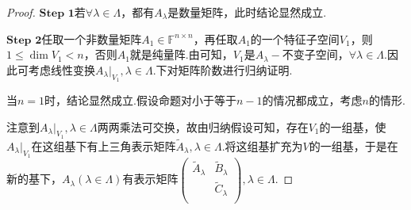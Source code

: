 \documentclass[../../main.tex]{subfiles}
\begin{document}
\begin{proof}
$\mathbf{Step}\,\,\mathbf{1}$若$\forall \lambda \in \Lambda$，都有$A_{\lambda}$是数量矩阵，此时结论显然成立.

$\mathbf{Step}\,\,\mathbf{2}$任取一个非数量矩阵$A_1\in \mathbb{F} ^{n\times n}$，再任取$A_1$的一个特征子空间$V_1$，则$1\leqslant \dim V_1<n$，否则$A_1$就是纯量阵.由可知，$V_1$是$A_{\lambda}-$不变子空间，$\forall \lambda \in \Lambda$.因此可考虑线性变换$A_{\lambda}|_{V_1},\lambda \in \Lambda$.下对矩阵阶数进行归纳证明.

当$n=1$时，结论显然成立.假设命题对小于等于$n - 1$的情况都成立，考虑$n$的情形.

注意到$A_{\lambda}|_{V_1},\lambda \in \Lambda$两两乘法可交换，故由归纳假设可知，存在$V_1$的一组基，使$A_{\lambda}|_{V_1}$在这组基下有上三角表示矩阵$\widetilde{A}_{\lambda},\lambda \in \Lambda$.将这组基扩充为$V$的一组基，于是在新的基下，$A_{\lambda}\left( \lambda \in \Lambda \right)$有表示矩阵$\begin{pmatrix}
\widetilde{A}_{\lambda}&		\widetilde{B}_{\lambda}\\
&		\widetilde{C}_{\lambda}\\
\end{pmatrix},\lambda \in \Lambda$.


\end{proof}
\end{document}
